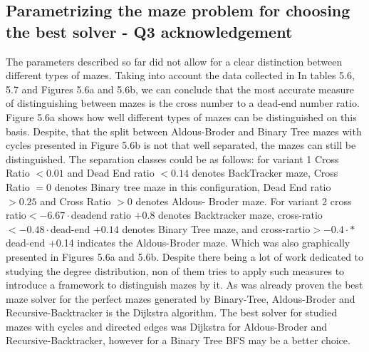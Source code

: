 \subsection{Parametrizing the maze problem for choosing the best solver - Q3 acknowledgement}
The parameters described so far did not allow for a clear distinction between different types of mazes. Taking into account the data collected in
In tables 5.6, 5.7 and Figures 5.6a and 5.6b, we can conclude that the most accurate measure of distinguishing between mazes is the cross number to a dead-end
number ratio. Figure 5.6a shows how well different types of mazes can be distinguished on this basis. Despite, that the split between Aldous-Broder and Binary Tree
mazes with cycles presented in Figure 5.6b is not that well separated, the mazes can still be distinguished. 
The separation classes could be as follows: for variant 1 Cross Ratio $< 0.01$ and Dead End ratio $< 0.14$ denotes BackTracker maze,
Cross Ratio $= 0$ denotes Binary tree maze in this configuration, Dead End ratio $> 0.25$ and Cross Ratio $> 0$ denotes Aldous- Broder maze.
For variant 2 cross ratio$ < -6.67\cdot$deadend ratio $+ 0.8$ denotes Backtracker maze, cross-ratio $< -0.48\cdot$dead-end $+0.14$ denotes Binary Tree maze, 
and cross-rartio$ > -0.4\cdot*$dead-end +0.14 indicates the Aldous-Broder maze. Which was also graphically presented in Figures 5.6a and 5.6b. 
Despite there being a lot of work dedicated to studying the degree distribution, non of them tries to apply such measures to introduce a framework to distinguish mazes by it.
As was already proven the best maze solver for the perfect mazes generated by Binary-Tree, Aldous-Broder and Recursive-Backtracker is the Dijkstra algorithm.
The best solver for studied mazes with cycles and directed edges was Dijkstra for Aldous-Broder and Recursive-Backtracker, however for a Binary Tree BFS may be a
better choice. 
